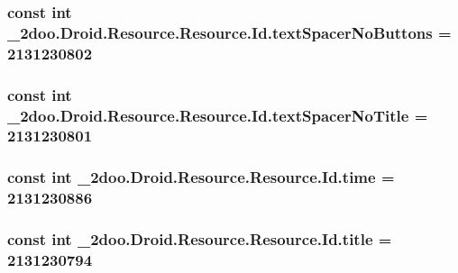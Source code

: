 \hypertarget{class__2doo_1_1_droid_1_1_resource_1_1_id_6ddd61e12da56845cd908ed1ed897dc3}{
\subsubsection[{textSpacerNoButtons}]{\setlength{\rightskip}{0pt plus 5cm}const int \_\-2doo.Droid.Resource.Resource.Id.textSpacerNoButtons = 2131230802}}
\label{class__2doo_1_1_droid_1_1_resource_1_1_id_6ddd61e12da56845cd908ed1ed897dc3}


\hypertarget{class__2doo_1_1_droid_1_1_resource_1_1_id_33d42f79b796eb8b8f70bf66458d3347}{
\subsubsection[{textSpacerNoTitle}]{\setlength{\rightskip}{0pt plus 5cm}const int \_\-2doo.Droid.Resource.Resource.Id.textSpacerNoTitle = 2131230801}}
\label{class__2doo_1_1_droid_1_1_resource_1_1_id_33d42f79b796eb8b8f70bf66458d3347}


\hypertarget{class__2doo_1_1_droid_1_1_resource_1_1_id_1ca15b4ef5a532f07661a1f71ea06cff}{
\subsubsection[{time}]{\setlength{\rightskip}{0pt plus 5cm}const int \_\-2doo.Droid.Resource.Resource.Id.time = 2131230886}}
\label{class__2doo_1_1_droid_1_1_resource_1_1_id_1ca15b4ef5a532f07661a1f71ea06cff}


\hypertarget{class__2doo_1_1_droid_1_1_resource_1_1_id_7fb7e11ddfa255ca02b48c0c1ac319cb}{
\subsubsection[{title}]{\setlength{\rightskip}{0pt plus 5cm}const int \_\-2doo.Droid.Resource.Resource.Id.title = 2131230794}}
\label{class__2doo_1_1_droid_1_1_resource_1_1_id_7fb7e11ddfa255ca02b48c0c1ac319cb}


